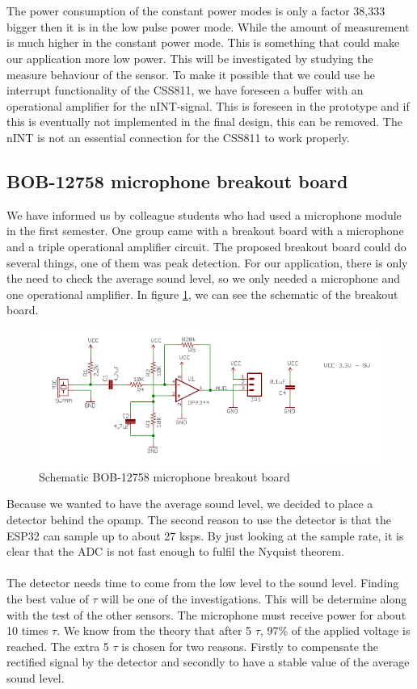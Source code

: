 \documentclass[11pt,a4paper]{article}
\begin{document}
\\ \\
The power consumption of the constant power modes is only a factor 38,333 bigger then it is in the low pulse power mode. While the amount of measurement is much higher in the constant power mode. This is something that could make our application more low power. This will be investigated by studying the measure behaviour of the sensor. To make it possible that we could use he interrupt functionality of the CSS811, we have foreseen a buffer with an operational amplifier for the nINT-signal.  This is foreseen in the prototype and if this is eventually not implemented in the final design, this can be removed. The nINT is not an essential connection for the CSS811 to work properly.


\subsection{BOB-12758 microphone breakout board}
We have informed us by colleague students who had used a microphone module in the first semester. One group came with a breakout board with a microphone and a triple operational amplifier circuit. The proposed breakout board could do several things, one of them was peak detection. For our application, there is only the need to check the average sound level, so we only needed a microphone and one operational amplifier. In figure \ref{fig:BOB-12758}, we can see the schematic of the breakout board.

\begin{figure}[H]
	\centering
	\includegraphics[width=0.8\linewidth]{schematic microphone break out board.png}
	\caption{Schematic BOB-12758 microphone breakout board}
	\label{fig:BOB-12758}
\end{figure}
Because we wanted to have the average sound level, we decided to place a detector behind the opamp. The second reason to use the detector is that the ESP32 can sample up to about 27 ksps. By just looking at the sample rate, it is clear that the ADC is not fast enough to fulfil the Nyquist theorem. 
\\ \\
The detector needs time to come from the low level to the sound level. Finding the best value of $\tau$ will be one of the investigations. This will be determine along with the test of the other sensors. The microphone must receive power for about 10 times $\tau$. We know from the theory that after 5 $\tau$, 97\% of the applied voltage is reached. The extra 5 $\tau$ is chosen for two reasons. Firstly to compensate the rectified signal by the detector and secondly to have a stable value of the average sound level.
\end{document}
